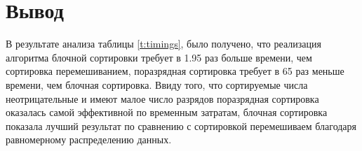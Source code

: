 \section*{Вывод}
В результате анализа таблицы \ref{t:timings}, было получено, что  реализация алгоритма  блочной сортировки требует в 1.95 раз больше  времени, чем сортировка перемешиванием, поразрядная сортировка требует в 65 раз меньше времени, чем блочная сортировка. Ввиду того, что сортируемые числа неотрицательные и имеют малое число разрядов поразрядная сортировка оказалась самой эффективной по временным затратам, блочная сортировка показала лучший результат по сравнению с сортировкой перемешиваем благодаря равномерному распределению данных.


